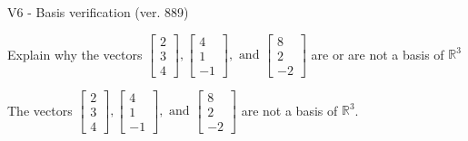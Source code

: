 \begin{exercise}
  \begin{exerciseTitle}V6 - Basis verification (ver. 889)\end{exerciseTitle}
  \begin{exerciseStatement}
    Explain why the vectors \(\left[\begin{array}{r}
2 \\
3 \\
4
\end{array}\right] , \left[\begin{array}{r}
4 \\
1 \\
-1
\end{array}\right] , \text{ and } \left[\begin{array}{r}
8 \\
2 \\
-2
\end{array}\right]\) are or are not a basis of \(\mathbb{R}^3\)	


  \end{exerciseStatement}
  \begin{exerciseAnswer}
   The vectors \(\left[\begin{array}{r}
2 \\
3 \\
4
\end{array}\right] , \left[\begin{array}{r}
4 \\
1 \\
-1
\end{array}\right] , \text{ and } \left[\begin{array}{r}
8 \\
2 \\
-2
\end{array}\right]\) 
  	 are not  a basis of \(\mathbb{R}^3\).
  


  \end{exerciseAnswer}
\end{exercise}